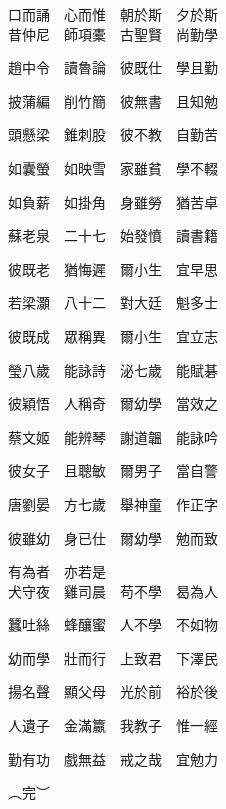 \documentclass[a4paper,twocolumn]{article}
\begin{document}
\begin{Large}
口而誦　心而惟　朝於斯　夕於斯
\\

昔仲尼　師項橐　古聖賢　尚勤學

趙中令　讀魯論　彼既仕　學且勤

披蒲編　削竹簡　彼無書　且知勉

頭懸梁　錐刺股　彼不教　自勤苦

如囊螢　如映雪　家雖貧　學不輟

如負薪　如掛角　身雖勞　猶苦卓

蘇老泉　二十七　始發憤　讀書籍

彼既老　猶悔遲　爾小生　宜早思

若梁灝　八十二　對大廷　魁多士

彼既成　眾稱異　爾小生　宜立志

瑩八歲　能詠詩　泌七歲　能賦碁

彼穎悟　人稱奇　爾幼學　當效之

蔡文姬　能辨琴　謝道韞　能詠吟

彼女子　且聰敏　爾男子　當自警

唐劉晏　方七歲　舉神童　作正字

彼雖幼　身已仕　爾幼學　勉而致

有為者　亦若是
\\

犬守夜　雞司晨　苟不學　曷為人

蠶吐絲　蜂釀蜜　人不學　不如物

幼而學　壯而行　上致君　下澤民

揚名聲　顯父母　光於前　裕於後

人遺子　金滿籝　我教子　惟一經

勤有功　戲無益　戒之哉　宜勉力

︵完︶

\end{Large}
\end{document}
